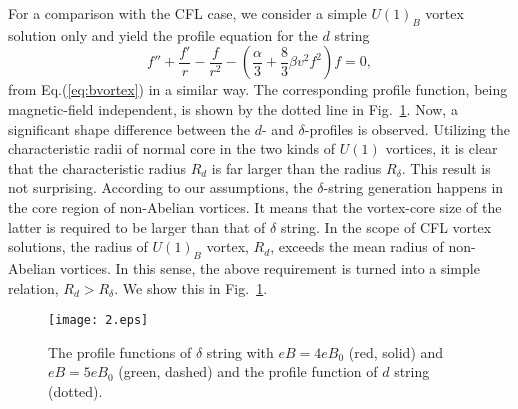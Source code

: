 For a comparison with the CFL case, we consider a simple $U(1)_B$ vortex solution only and yield the
profile equation for the $d$ string
\begin{equation}
  \label{eq:bvortexprofile}
  f'' + \frac{f'}{r} -\frac{f}{r^2} - (\frac{\alpha}{3} + \frac{8}{3}\beta v^2 f^2)f=0,
\end{equation}
from Eq.(\ref{eq:bvortex}) in a similar way.
The corresponding profile function, being magnetic-field independent, is shown by the dotted line in
Fig.~\ref{fig:2}. Now, a significant shape difference between the $d$- and $\delta$-profiles is observed.
Utilizing the characteristic radii of normal core in the two kinds of $U(1)$ vortices, it is clear that
the characteristic radius $R_d$ is far larger than the radius $R_\delta$.
This result is not surprising. According to our assumptions, the $\delta$-string generation happens in
the core region of non-Abelian vortices. It means that the vortex-core size of the latter is required
to be larger than that of $\delta$ string. In the scope of CFL vortex solutions, the radius of $U(1)_B$ vortex, $R_d$, exceeds the mean radius of non-Abelian vortices. In this sense, the
above requirement is turned into a simple relation, $R_d > R_\delta$. We show this in Fig.~\ref{fig:2}.

\begin{figure}[ht]
\centering
\texttt{[image: 2.eps]}
	\caption{The profile functions of $\delta$ string with $eB = 4eB_0$ (red, solid) and $eB =
    5 eB_0$ (green, dashed) and the profile function of $d$ string (dotted).}
	\label{fig:2}
\end{figure}

